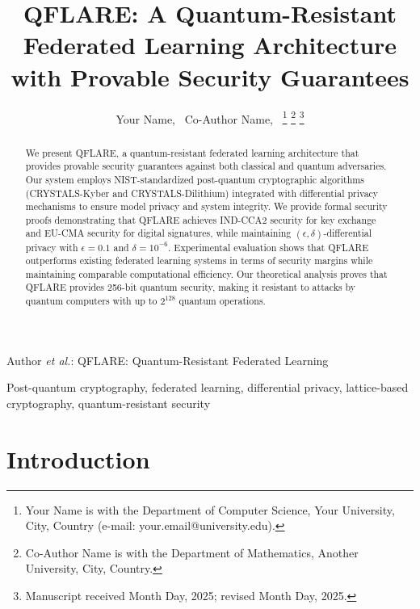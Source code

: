 \documentclass[journal,onecolumn,draftclsnofoot]{IEEEtran}
\begin{document}
\title{QFLARE: A Quantum-Resistant Federated Learning Architecture with Provable Security Guarantees}

\author{Your Name,~
        Co-Author Name,~
\thanks{Your Name is with the Department of Computer Science, Your University, City, Country (e-mail: your.email@university.edu).}
\thanks{Co-Author Name is with the Department of Mathematics, Another University, City, Country.}
\thanks{Manuscript received Month Day, 2025; revised Month Day, 2025.}}

%
{Author \MakeLowercase{\textit{et al.}}: QFLARE: Quantum-Resistant Federated Learning}

\maketitle

\begin{abstract}
We present QFLARE, a quantum-resistant federated learning architecture that provides provable security guarantees against both classical and quantum adversaries. Our system employs NIST-standardized post-quantum cryptographic algorithms (CRYSTALS-Kyber and CRYSTALS-Dilithium) integrated with differential privacy mechanisms to ensure model privacy and system integrity. We provide formal security proofs demonstrating that QFLARE achieves IND-CCA2 security for key exchange and EU-CMA security for digital signatures, while maintaining $(\epsilon, \delta)$-differential privacy with $\epsilon = 0.1$ and $\delta = 10^{-6}$. Experimental evaluation shows that QFLARE outperforms existing federated learning systems in terms of security margins while maintaining comparable computational efficiency. Our theoretical analysis proves that QFLARE provides 256-bit quantum security, making it resistant to attacks by quantum computers with up to $2^{128}$ quantum operations.
\end{abstract}

\begin{IEEEkeywords}
Post-quantum cryptography, federated learning, differential privacy, lattice-based cryptography, quantum-resistant security
\end{IEEEkeywords}

\IEEEpeerreviewmaketitle

\section{Introduction}
\end{document}
